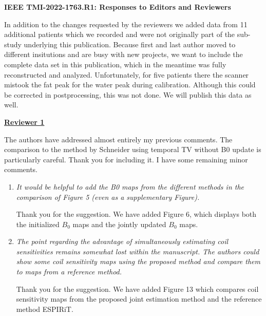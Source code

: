 \documentclass[a4paper,11pt]{report}
\begin{document}
	
\begin{center}
	{\large\textbf{IEEE TMI-2022-1763.R1: Responses to Editors and Reviewers}}
\end{center}


\noindent In addition to the changes requested by the reviewers we added
data from 11 additional patients which we recorded and were not originally
part of the sub-study underlying this publication. Because first and last
author moved to different insitutions and are busy with new projects, 
we want to include the complete data set in this publication, which in
the meantime was fully reconstructed and analyzed.  Unfortunately, for
five patients there the scanner mistook the fat peak for the water
peak during calibration. Although this could be corrected in postprocessing,
this was not done. We will publish this data as well.


\noindent \underline{\textbf{Reviewer 1}}

\noindent The authors have addressed almost entirely my previous comments. The comparison to the method by Schneider using temporal TV without B0 update is particularly careful. Thank you for including it. I have some remaining minor comments.

\begin{enumerate}
	\item \textit{It would be helpful to add the B0 maps from the different methods in the comparison of Figure 5 (even as a supplementary Figure).}

\hspace{1em} Thank you for the suggestion. 
We have added Figure 6, 
which displays both the initialized $B_0$ maps and the jointly updated $B_0$ maps.

	\item \textit{The point regarding the advantage of simultaneously estimating coil sensitivities remains somewhat lost within the manuscript. The authors could show some coil sensitivity maps using the proposed method and compare them to  maps from a reference method.}

\hspace{1em} Thank you for the suggestion. 
We have added Figure 13 which compares coil sensitivity maps from 
the proposed joint estimation method and the reference method ESPIRiT.

\end{enumerate}
\end{document}
